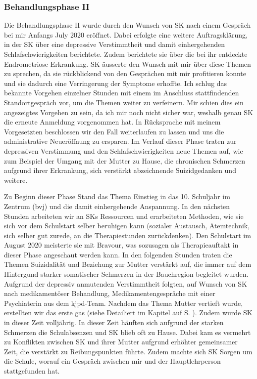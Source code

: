 \subsubsection{Behandlungsphase II}
Die Behandlungsphase II wurde durch den Wunsch von SK nach einem Gespräch bei mir Anfangs July 2020 eröffnet. Dabei erfolgte eine weitere Auftragsklärung, in der SK über eine depressive Verstimmtheit und damit einhergehenden Schlafschwierigkeiten berichtete. Zudem berichtete sie über die bei ihr entdeckte Endrometriose Erkrankung. SK äusserte den Wunsch mit mir über diese Themen zu sprechen, da sie rückblickend von den Gesprächen mit mir profitieren konnte und sie dadurch eine Verringerung der Symptome erhoffte. Ich schlug das bekannte Vorgehen einzelner Stunden mit einem im Anschluss stattfindenden Standortgespräch vor, um die Themen weiter zu verfeinern. Mir schien dies ein angezeigtes Vorgehen zu sein, da ich mir noch nicht sicher war, weshalb genau SK die erneute Anmeldung vorgenommen hat. In Rücksprache mit meinem Vorgesetzten beschlossen wir den Fall weiterlaufen zu lassen und uns die administrative Neueröffnung zu ersparen. Im Verlauf dieser Phase traten zur depressiven Verstimmung und den Schlafschwierigkeiten neue Themen auf, wie zum Beispiel der Umgang mit der Mutter zu Hause, die chronischen Schmerzen aufgrund ihrer Erkrankung, sich verstärkt abzeichnende Suizidgedanken und weitere.

Zu Beginn dieser Phase Stand das Thema Einstieg in das 10. Schuljahr im Zentrum (\ac{bvj}) und die damit einhergehende Anspannung. In den nächsten Stunden arbeiteten wir an SKs Ressourcen und erarbeiteten Methoden, wie sie sich vor dem Schulstart selber beruhigen kann (sozialer Austausch, Atemtechnik, sich selber gut zurede, an die Therapiestunden zurückdenken). Den Schulstart im August 2020 meisterte sie mit Bravour, was sozusagen als Therapieauftakt in dieser Phase angeschaut werden kann. In den folgenden Stunden traten die Themen Suizidalität und Beziehung zur Mutter verstärkt auf, die immer auf dem Hintergund starker somatischer Schmerzen in der Bauchregion begleitet wurden. Aufgrund der depressiv anmutenden Verstimmtheit folgten, auf Wunsch von SK nach medikamentöser Behandlung, Medikamentengespräche mit einer Psychiaterin aus dem \ac{kjpd}-Team. Nachdem das Thema Mutter vertieft wurde, erstellten wir das erste \ac{gas} (siehe Detailiert im Kapitel  auf S. \pageref{lbEvaluationsverfahren}). Zudem wurde SK in dieser Zeit volljährig. In dieser Zeit häuften sich aufgrund der starken Schmerzen die Schulabsenzen und SK blieb oft zu Hause. Dabei kam es vermehrt zu Konflikten zwischen SK und ihrer Mutter aufgrund erhöhter gemeinsamer Zeit, die verstärkt zu Reibungspunkten führte. Zudem machte sich SK Sorgen um die Schule, worauf ein Gespräch zwischen mir und der Hauptlehrperson stattgefunden hat. 

